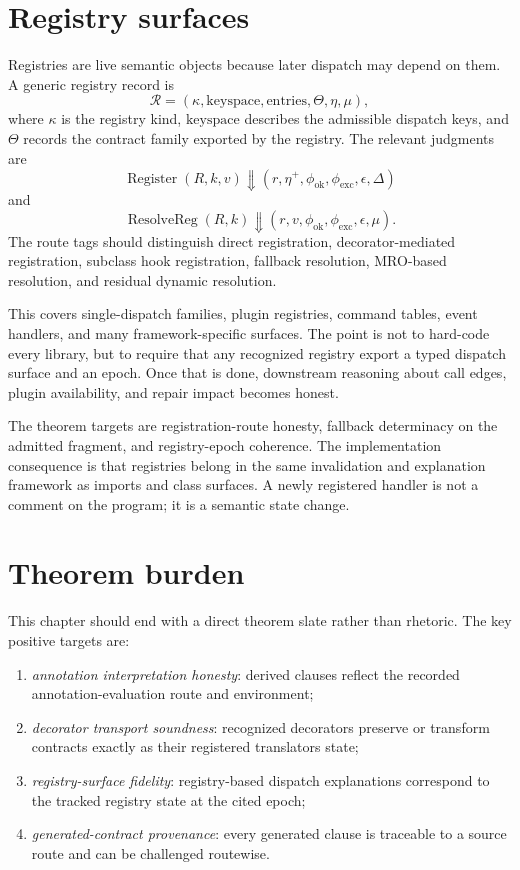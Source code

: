 \documentclass[11pt]{report}
\begin{document}
\section{Registry surfaces}
Registries are live semantic objects because later dispatch may depend on them. A generic registry record is
\[
\mathcal{R} = (\kappa,\mathrm{keyspace},\mathrm{entries},\Theta,\eta,\mu),
\]
where $\kappa$ is the registry kind, $\mathrm{keyspace}$ describes the admissible dispatch keys, and $\Theta$ records the contract family exported by the registry. The relevant judgments are
\[
\operatorname{Register}(R,k,v) \Downarrow (r,\eta^{+},\phi_{\mathrm{ok}},\phi_{\mathrm{exc}},\epsilon,\Delta)
\]
and
\[
\operatorname{ResolveReg}(R,k) \Downarrow (r,v,\phi_{\mathrm{ok}},\phi_{\mathrm{exc}},\epsilon,\mu).
\]
The route tags should distinguish direct registration, decorator-mediated registration, subclass hook registration, fallback resolution, MRO-based resolution, and residual dynamic resolution.

This covers single-dispatch families, plugin registries, command tables, event handlers, and many framework-specific surfaces. The point is not to hard-code every library, but to require that any recognized registry export a typed dispatch surface and an epoch. Once that is done, downstream reasoning about call edges, plugin availability, and repair impact becomes honest.

The theorem targets are registration-route honesty, fallback determinacy on the admitted fragment, and registry-epoch coherence. The implementation consequence is that registries belong in the same invalidation and explanation framework as imports and class surfaces. A newly registered handler is not a comment on the program; it is a semantic state change.
\section{Theorem burden}
This chapter should end with a direct theorem slate rather than rhetoric. The key positive targets are:
\begin{enumerate}
\item \emph{annotation interpretation honesty}: derived clauses reflect the recorded annotation-evaluation route and environment;
\item \emph{decorator transport soundness}: recognized decorators preserve or transform contracts exactly as their registered translators state;
\item \emph{registry-surface fidelity}: registry-based dispatch explanations correspond to the tracked registry state at the cited epoch;
\item \emph{generated-contract provenance}: every generated clause is traceable to a source route and can be challenged routewise.
\end{enumerate}
\end{document}
